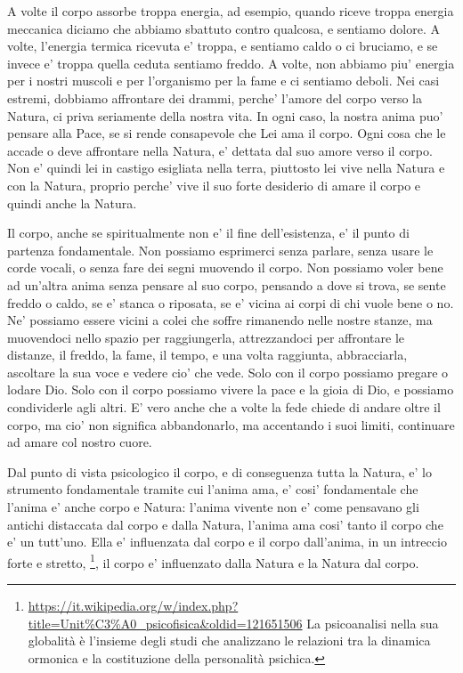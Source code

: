 A volte il corpo assorbe troppa energia, ad esempio, quando riceve troppa energia meccanica diciamo che abbiamo sbattuto contro qualcosa, e sentiamo dolore. A volte, l'energia termica ricevuta e' troppa, e sentiamo caldo o ci bruciamo, e se invece e' troppa quella ceduta sentiamo freddo. A volte, non abbiamo piu' energia per i nostri muscoli e per l'organismo per la fame e ci sentiamo deboli. Nei casi estremi, dobbiamo affrontare dei drammi, perche' l'amore del corpo verso la Natura, ci priva seriamente della nostra vita. In ogni caso, la nostra anima puo' pensare alla Pace, se si rende consapevole che Lei ama il corpo. Ogni cosa che le accade o deve affrontare nella Natura, e' dettata dal suo amore verso il corpo. Non e' quindi lei in castigo esigliata nella terra, piuttosto lei vive nella Natura e con la Natura, proprio perche' vive il suo forte desiderio di amare il corpo e quindi anche la Natura. 

Il corpo, anche se spiritualmente non e' il fine dell'esistenza, e' il punto di partenza fondamentale. Non possiamo esprimerci senza parlare, senza usare le corde vocali, o senza fare dei segni muovendo il corpo. Non possiamo voler bene ad un'altra anima senza pensare al suo corpo, pensando a dove si trova, se sente freddo o caldo, se e' stanca o riposata, se e' vicina ai corpi di chi vuole bene o no. Ne' possiamo essere vicini a colei che soffre rimanendo nelle nostre stanze, ma muovendoci nello spazio per raggiungerla, attrezzandoci per affrontare le distanze, il freddo, la fame, il tempo, e una volta raggiunta, abbracciarla, ascoltare la sua voce e vedere cio' che vede.
Solo con il corpo possiamo pregare o lodare Dio. Solo con il corpo possiamo vivere la pace e la gioia di Dio, e possiamo condividerle agli altri. E' vero anche che a volte la fede chiede di andare oltre il corpo, ma cio' non significa abbandonarlo, ma accentando i suoi limiti, continuare ad amare col nostro cuore.

Dal punto di vista psicologico il corpo, e di conseguenza tutta la Natura, e' lo strumento fondamentale tramite cui l'anima ama, e' cosi' fondamentale che l'anima e' anche corpo e Natura: l'anima vivente non e' come pensavano gli antichi distaccata dal corpo e dalla Natura, l'anima ama cosi' tanto il corpo che e' un tutt'uno. Ella e' influenzata dal corpo e il corpo dall'anima, in un intreccio forte e stretto, \footnote{
    \url{https://it.wikipedia.org/w/index.php?title=Unit\%C3\%A0\_psicofisica&oldid=121651506}
    La psicoanalisi nella sua globalità è l'insieme degli studi che analizzano le relazioni tra la dinamica ormonica e la costituzione della personalità psichica. 
}, il corpo e' influenzato dalla Natura e la Natura dal corpo.


